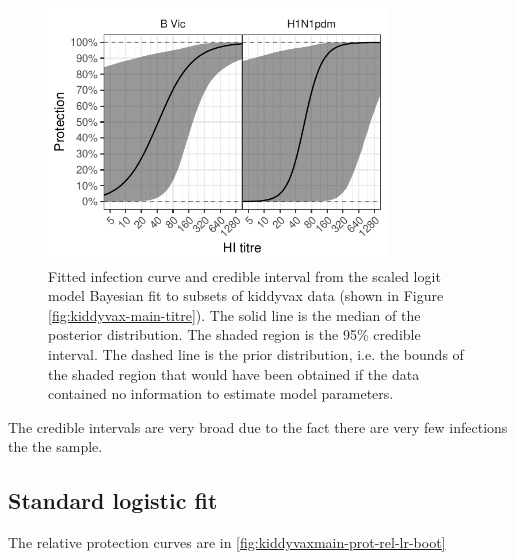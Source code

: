 \documentclass[12pt]{article}
\begin{document}
\begin{figure}[htp]
	\centering
	\includegraphics[width=0.8\textwidth]{../fit-sclr-bayesian-plot/kiddyvaxmain-prot.pdf}
	\caption{
Fitted infection curve and credible interval from the scaled logit model Bayesian fit to subsets of kiddyvax data (shown in Figure \ref{fig:kiddyvax-main-titre}). The solid line is the median of the posterior distribution. The shaded region is the 95\% credible interval. The dashed line is the prior distribution, i.e. the bounds of the shaded region that would have been obtained if the data contained no information to estimate model parameters.
	}
	\label{fig:kiddyvaxmain-prot-bayes-sclr}
\end{figure}

The credible intervals are very broad due to the fact there are very few infections the the sample.

\subsection{Standard logistic fit}

The relative protection curves are in \ref{fig:kiddyvaxmain-prot-rel-lr-boot}
\end{document}
